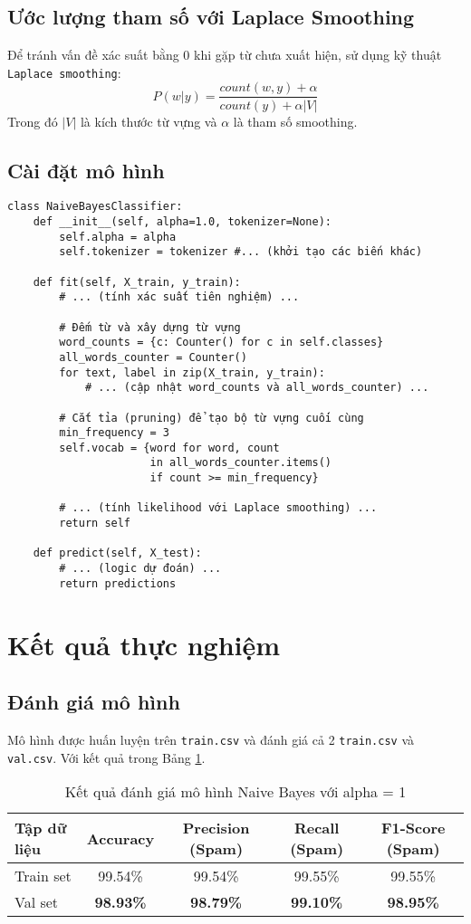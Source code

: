\subsection{Ước lượng tham số với Laplace Smoothing}
Để tránh vấn đề xác suất bằng 0 khi gặp từ chưa xuất hiện, sử dụng kỹ thuật \texttt{Laplace smoothing}:
$$P(w|y) = \frac{count(w, y) + \alpha}{count(y) + \alpha|V|}$$
Trong đó $|V|$ là kích thước từ vựng và $\alpha$ là tham số smoothing.

\subsection{Cài đặt mô hình}
\begin{verbatim}
class NaiveBayesClassifier:
    def __init__(self, alpha=1.0, tokenizer=None):
        self.alpha = alpha
        self.tokenizer = tokenizer #... (khởi tạo các biến khác)

    def fit(self, X_train, y_train):
        # ... (tính xác suất tiên nghiệm) ...
        
        # Đếm từ và xây dựng từ vựng
        word_counts = {c: Counter() for c in self.classes}
        all_words_counter = Counter()
        for text, label in zip(X_train, y_train):
            # ... (cập nhật word_counts và all_words_counter) ...
        
        # Cắt tỉa (pruning) để tạo bộ từ vựng cuối cùng
        min_frequency = 3
        self.vocab = {word for word, count 
                      in all_words_counter.items() 
                      if count >= min_frequency}
        
        # ... (tính likelihood với Laplace smoothing) ...
        return self

    def predict(self, X_test):
        # ... (logic dự đoán) ...
        return predictions
\end{verbatim}

\section{Kết quả thực nghiệm}

\subsection{Đánh giá mô hình}
Mô hình được huấn luyện trên \texttt{train.csv} và đánh giá cả 2 \texttt{train.csv} và \texttt{val.csv}. Với kết quả trong Bảng \ref{tab:results}.

\begin{table}[H]
\centering
\begin{tabular}{|l|c|c|c|c|}
\hline
\textbf{Tập dữ liệu} & \textbf{Accuracy} & \textbf{Precision (Spam)} & \textbf{Recall (Spam)} & \textbf{F1-Score (Spam)} \\
\hline
Train set & 99.54\% & 99.54\% & 99.55\% & 99.55\% \\
\hline
Val set & \textbf{98.93\%} & \textbf{98.79\%} & \textbf{99.10\%} & \textbf{98.95\%} \\
\hline
\end{tabular}
\caption{Kết quả đánh giá mô hình Naive Bayes với alpha = 1}
\label{tab:results}
\end{table}

